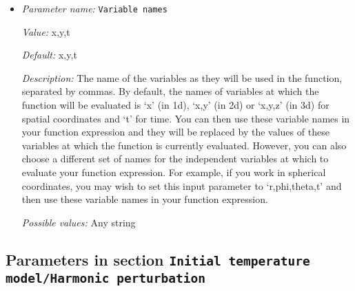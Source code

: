 \begin{itemize}
{\it Value:} 0


{\it Default:} 0


{\it Description:} The formula that denotes the function you want to evaluate for particular values of the independent variables. This expression may contain any of the usual operations such as addition or multiplication, as well as all of the common functions such as `sin' or `cos'. In addition, it may contain expressions like `if(x>0, 1, -1)' where the expression evaluates to the second argument if the first argument is true, and to the third argument otherwise. For a full overview of possible expressions accepted see the documentation of the muparser library at http://muparser.beltoforion.de/.

If the function you are describing represents a vector-valued function with multiple components, then separate the expressions for individual components by a semicolon.


{\it Possible values:} Any string
\item {\it Parameter name:} {\tt Variable names}
\label{parameters:Initial temperature model/Function/Variable names}


{\it Value:} x,y,t


{\it Default:} x,y,t


{\it Description:} The name of the variables as they will be used in the function, separated by commas. By default, the names of variables at which the function will be evaluated is `x' (in 1d), `x,y' (in 2d) or `x,y,z' (in 3d) for spatial coordinates and `t' for time. You can then use these variable names in your function expression and they will be replaced by the values of these variables at which the function is currently evaluated. However, you can also choose a different set of names for the independent variables at which to evaluate your function expression. For example, if you work in spherical coordinates, you may wish to set this input parameter to `r,phi,theta,t' and then use these variable names in your function expression.


{\it Possible values:} Any string
\end{itemize}

\subsection{Parameters in section \tt Initial temperature model/Harmonic perturbation}
\label{parameters:Initial_20temperature_20model/Harmonic_20perturbation}

